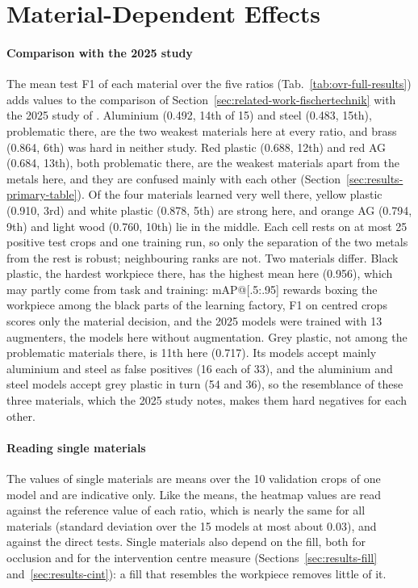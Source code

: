 \section{Material-Dependent Effects}
\label{sec:discussion-material}

\paragraph{Comparison with the 2025 study}
The mean test F1 of each material over the five ratios (Tab.~\ref{tab:ovr-full-results})
adds values to the comparison of Section~\ref{sec:related-work-fischertechnik} with the
2025 study of \citet*{schneidereitYOLOv8}. Aluminium
(0.492, 14th of 15) and steel (0.483, 15th), problematic there, are the two weakest
materials here at every ratio, and brass (0.864, 6th) was hard in neither study. Red
plastic (0.688, 12th) and red AG (0.684, 13th), both problematic there, are the weakest
materials apart from the metals here, and they are confused mainly with each other
(Section~\ref{sec:results-primary-table}). Of the four materials learned very well
there, yellow plastic (0.910, 3rd) and white plastic (0.878, 5th) are strong here, and
orange AG (0.794, 9th) and light wood (0.760, 10th) lie in the middle. Each cell rests
on at most 25 positive test crops and one training run, so only the separation of the two
metals from the rest is robust; neighbouring ranks are not. Two materials
differ. Black plastic, the hardest workpiece there, has the highest mean here (0.956),
which may partly come from task and training: mAP@[.5:.95] rewards boxing the workpiece
among the black parts of the learning factory, F1 on centred crops scores only the
material decision, and the 2025 models were trained with 13 augmenters, the models here
without augmentation. Grey plastic, not among the problematic materials there, is 11th
here (0.717). Its models accept mainly aluminium and steel as false positives (16 each of
33), and the aluminium and steel models accept grey plastic in turn (54 and 36), so the
resemblance of these three materials, which the 2025 study notes, makes them hard
negatives for each other.

\paragraph{Reading single materials}
The values of single materials are means over the 10 validation crops of one model and
are indicative only. Like the means, the heatmap values are read against the reference
value of each ratio, which is nearly the same for all materials (standard deviation over
the 15 models at most about 0.03), and against the direct tests. Single materials also
depend on the fill, both for occlusion and for the intervention centre measure
(Sections~\ref{sec:results-fill} and~\ref{sec:results-cint}): a fill that resembles the
workpiece removes little of it.

